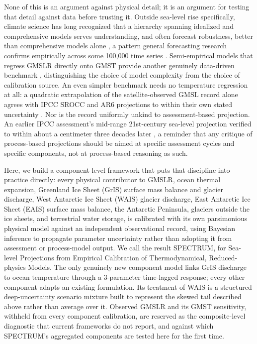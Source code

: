 \documentclass[12pt]{article}
\begin{document}
None of this is an argument against physical detail; it is an argument
for testing that detail against data before trusting it. Outside
sea-level rise specifically, climate science has long recognized that a
hierarchy spanning idealized and comprehensive models serves
understanding, and often forecast robustness, better than comprehensive
models alone \citep{Held2005}, a pattern general forecasting research
confirms empirically across some 100,000 time series
\citep{Green2015,Makridakis2020}. Semi-empirical models that regress GMSLR
directly onto GMST provide another genuinely data-driven benchmark
\citep{Rahmstorf2007,Vermeer2009}, distinguishing the choice of model
complexity from the choice of calibration source. An even simpler
benchmark needs no temperature regression at all: a quadratic
extrapolation of the satellite-observed GMSL record alone agrees with
IPCC SROCC and AR6 projections to within their own stated uncertainty
\citep{Nerem2022}. Nor is the record
uniformly unkind to assessment-based projection. An earlier IPCC
assessment's mid-range 21st-century sea-level projection verified to
within about a centimeter three decades later \citep{Tornqvist2025}, a
reminder that any critique of process-based projections should be aimed at
specific assessment cycles and specific components, not at process-based
reasoning as such.

Here, we build a component-level framework that puts that discipline into
practice directly: every physical contributor to GMSLR, ocean thermal
expansion, Greenland Ice Sheet (GrIS) surface mass balance and glacier
discharge, West Antarctic Ice Sheet (WAIS) glacier discharge, East
Antarctic Ice Sheet (EAIS) surface mass balance, the Antarctic Peninsula,
glaciers outside the ice sheets, and terrestrial water storage, is
calibrated with its own parsimonious physical model against an
independent observational record, using Bayesian inference to propagate
parameter uncertainty rather than adopting it from assessment or
process-model output. We call the result SPECTRUM, for Sea-level
Projections from Empirical Calibration of Thermodynamical, Reduced-physics
Models. The only genuinely new component model links GrIS discharge to
ocean temperature through a 3-parameter time-lagged response; every other
component adapts an existing formulation. Its treatment of WAIS is a
structured
deep-uncertainty scenario mixture built to represent the skewed tail
described above rather than average over it. Observed GMSLR and its GMST
sensitivity, withheld from every component calibration, are reserved as
the composite-level diagnostic that current frameworks do not report, and
against which SPECTRUM's aggregated components are tested here for the
first time.
\end{document}
